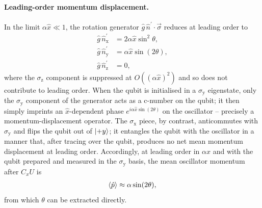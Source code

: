 \documentclass[aps,prx,showpacs,notitlepage,twocolumn,superscriptaddress,nofootinbib,preprintnumbers,floatfix,10pt, longbibliography]{revtex4-2}
\begin{document}
{\paragraph{Leading-order momentum displacement.}
In the limit $\alpha\hat{x}\ll 1$, the rotation generator
$\hat{g}\,\hat{n}^\prime\cdot\vec{\sigma}$ reduces at leading order to
\begin{align}
  \hat{g}\,\hat{n}_\mathrm{x}^\prime &= 2\alpha\hat{x}\sin^2\theta, \\
  \hat{g}\,\hat{n}_\mathrm{y}^\prime &= \alpha\hat{x}\sin(2\theta), \\
  \hat{g}\,\hat{n}_\mathrm{z}^\prime &= 0,
\end{align}
where the $\sigma_\mathrm{z}$ component is suppressed at
$O((\alpha\hat{x})^2)$ and so does not contribute to leading order.
When the qubit is initialised in a $\sigma_\mathrm{y}$ eigenstate,
only the $\sigma_\mathrm{y}$ component of the generator acts as a
c-number on the qubit; it then simply imprints an $\hat{x}$-dependent
phase $e^{i\alpha\hat{x}\sin(2\theta)}$ on the oscillator -- precisely
a momentum-displacement operator. The $\sigma_\mathrm{x}$ piece, by
contrast, anticommutes with $\sigma_\mathrm{y}$ and flips the qubit
out of $\ket{+y}$; it entangles the qubit with the oscillator in a
manner that, after tracing over the qubit, produces no net mean
momentum displacement at leading order. Accordingly, at leading order
in $\alpha\hat{x}$ and with the qubit prepared and measured in the
$\sigma_\mathrm{y}$ basis, the mean oscillator momentum after $C_xU$
is
\begin{align}
  \braket{\hat{p}} \approx \alpha\sin(2\theta),
  \label{eq:p_leading}
\end{align}
from which $\theta$ can be extracted directly.

}
\end{document}
